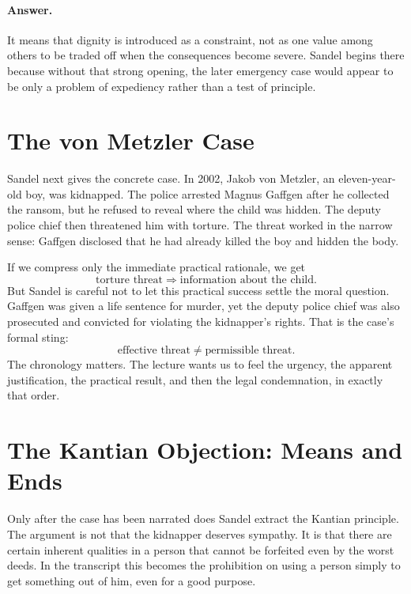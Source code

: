 \paragraph{Answer.} It means that dignity is introduced as a constraint, not as one value among others to be traded off when the consequences become severe. Sandel begins there because without that strong opening, the later emergency case would appear to be only a problem of expediency rather than a test of principle.

\section{The von Metzler Case}

Sandel next gives the concrete case. In 2002, Jakob von Metzler, an eleven-year-old boy, was kidnapped. The police arrested Magnus Gaffgen after he collected the ransom, but he refused to reveal where the child was hidden. The deputy police chief then threatened him with torture. The threat worked in the narrow sense: Gaffgen disclosed that he had already killed the boy and hidden the body.

If we compress only the immediate practical rationale, we get
\begin{equation}
\text{torture threat}
\Longrightarrow
\text{information about the child}.
\end{equation}
But Sandel is careful not to let this practical success settle the moral question. Gaffgen was given a life sentence for murder, yet the deputy police chief was also prosecuted and convicted for violating the kidnapper's rights. That is the case's formal sting:
\begin{equation}
\text{effective threat}
\neq
\text{permissible threat}.
\end{equation}
The chronology matters. The lecture wants us to feel the urgency, the apparent justification, the practical result, and then the legal condemnation, in exactly that order.

\section{The Kantian Objection: Means and Ends}

Only after the case has been narrated does Sandel extract the Kantian principle. The argument is not that the kidnapper deserves sympathy. It is that there are certain inherent qualities in a person that cannot be forfeited even by the worst deeds. In the transcript this becomes the prohibition on using a person simply to get something out of him, even for a good purpose.

